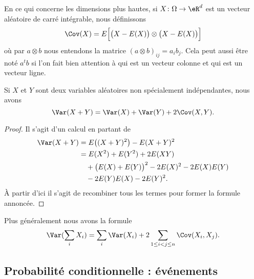En ce qui concerne les dimensions plus hautes, si \( X\colon \Omega\to \eR^d\) est un vecteur aléatoire de carré intégrable, nous définissons
\begin{equation}    \label{EqZlvLWx}
    \Cov(X)=E\Big[ \big(  X-E(X) \big)\otimes\big( X-E(X)\big) \Big]
\end{equation}
où par \( a\otimes b\) nous entendons la matrice \( (a\otimes b)_{ij}=a_ib_j\). Cela peut aussi être noté \( a^tb\) si l'on fait bien attention à qui est un vecteur colonne et qui est un vecteur ligne.

\begin{proposition}     \label{PropoVarXpYCov}
    Si \( X\) et \( Y\) sont deux variables aléatoires non spécialement indépendantes, nous avons
    \begin{equation}
        \Var(X+Y)=\Var(X)+\Var(Y)+2\Cov(X,Y).
    \end{equation}
\end{proposition}

\begin{proof}
    Il s'agit d'un calcul en partant de
    \begin{equation}
        \begin{aligned}[]
            \Var(X+Y)&=E\big( (X+Y)^2 \big)-E(X+Y)^2\\
            &=E(X^2)+E(Y^2)+2E(XY)\\
            &\quad+\big( E(X)+E(Y) \big)^2-2E(X)^2-2E(X)E(Y)\\
            &\quad-2 E(Y)E(X)-2E(Y)^2.
        \end{aligned}
    \end{equation}
    À partir d'ici il s'agit de recombiner tous les termes pour former la formule annoncée.
\end{proof}

Plus généralement nous avons la formule
\begin{equation}
    \Var(\sum_i X_i)=\sum_i\Var(X_i)+2\sum_{1\leq i< j\leq n}\Cov(X_i,X_j).
\end{equation}

\subsection{Probabilité conditionnelle : événements}

